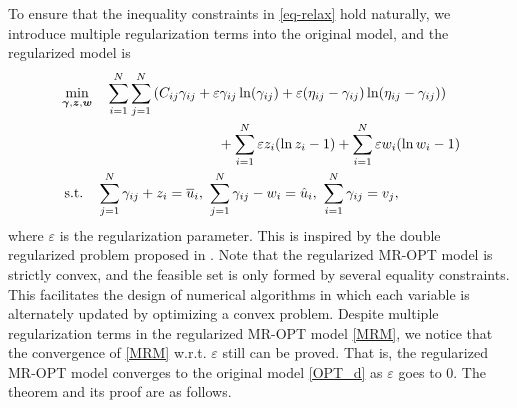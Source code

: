 \documentclass[review,hidelinks,onefignum,onetabnum]{siamart220329}
\begin{document}
To ensure that the inequality constraints in \cref{eq-relax} hold naturally, we introduce multiple regularization terms into the original model, and the regularized model is
\begin{equation}\label{MRM}
\begin{aligned}
& \mathtoolsset{multlined-width=0.9\displaywidth}
\begin{multlined}
    \min_{\bm{\gamma}, \bm{z}, \bm{w}} \quad \sum_{i=1}^{N}\sum_{j=1}^{N} \left(C_{ij}\gamma_{ij}+\varepsilon \gamma_{ij} \ln(\gamma_{ij})+\varepsilon (\eta_{ij}-\gamma_{ij}) \ln(\eta_{ij}-\gamma_{ij})\right) \\
    +\sum_{i=1}^{N} \varepsilon z_i (\ln z_i-1)+\sum_{i=1}^{N} \varepsilon w_i (\ln w_i-1)
\end{multlined}
\\
& \text{   s.t.} \quad \sum_{j=1}^{N} \gamma_{ij} + z_i = \overline{u}_i, \ \sum_{j=1}^{N} \gamma_{ij} - w_i = \hat{u}_i, \ \sum_{i=1}^N \gamma_{ij} = v_j,
\end{aligned}
\end{equation}
where $\varepsilon$ is the regularization parameter. 
This is inspired by the double regularized problem proposed in \cite{wu2022double}.
Note that the regularized MR-OPT model is strictly convex, and the feasible set is only formed by several equality constraints. This facilitates the design of numerical algorithms in which each variable is alternately updated by optimizing a convex problem. 
Despite multiple regularization terms in the regularized MR-OPT model \cref{MRM}, we notice that the convergence of \cref{MRM} w.r.t. $\varepsilon$ still can be proved. That is, the regularized MR-OPT model converges to the original model \cref{OPT_d} as $\varepsilon$ goes to $0$. The theorem and its proof are as follows. 
\end{document}
